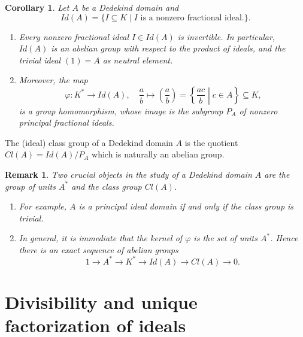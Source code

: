 \documentclass[a4paper]{book}
\theoremstyle{break}
\theoremstyle{plain}
\newtheorem{corollary}{Corollary}
\newtheorem{remark}{Remark}
\begin{document}
\begin{corollary}
    Let \(A\) be a Dedekind domain and
    \begin{equation}
        Id(A) = \{I \subseteq K \mid I \text{ is a nonzero fractional ideal.}\} \text{.}
    \end{equation}
    \begin{enumerate}
        \item Every nonzero fractional ideal \(I \in Id(A)\) is invertible. In particular, \(Id(A)\) is an abelian group with respect to the product of ideals, and the trivial ideal \((1) = A\) as neutral element.
        \item Moreover, the map
        \begin{equation}
            \varphi: K^* \rightarrow Id(A), \quad \frac{a}{b} \mapsto \left(\frac{a}{b}\right) = \left\{\frac{ac}{b} \middle| c \in A \right\} \subseteq K \text{,}
        \end{equation}
        is a group homomorphism, whose image is the subgroup \(P_A\) of nonzero principal fractional ideals.
    \end{enumerate}
\end{corollary}

\newpage

\begin{definition}
    The {\color{maththen}(ideal) class group} of a {\color{mathif}Dedekind domain} \(A\) is the quotient \(Cl(A) = Id(A) / P_A\) which is naturally an abelian group.
\end{definition}

\begin{remark}
    Two crucial objects in the study of a Dedekind domain \(A\) are the group of units \(A^*\) and the class group \(Cl(A)\).
    \begin{enumerate}
        \item For example, \(A\) is a principal ideal domain if and only if the class group is trivial.
        \item In general, it is immediate that the kernel of \(\varphi\) is the set of units \(A^*\). Hence there is an exact sequence of abelian groups
        \begin{equation}
            1 \rightarrow A^* \rightarrow K^* \rightarrow Id(A) \rightarrow Cl(A) \rightarrow 0 \text{.}
        \end{equation}
    \end{enumerate}
\end{remark}

\section{Divisibility and unique factorization of ideals}
\end{document}
